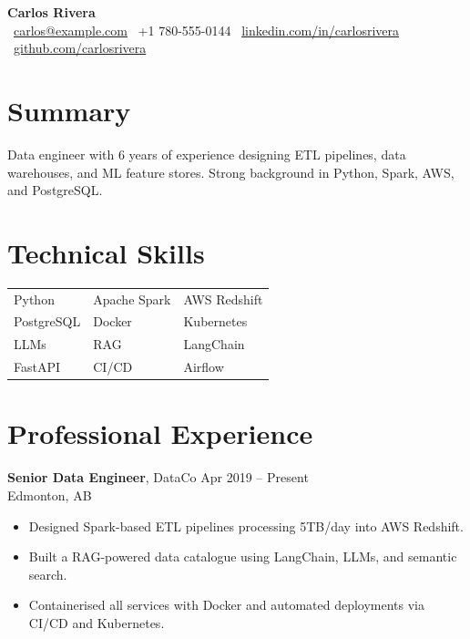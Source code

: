 \documentclass[10pt, letterpaper]{article}
\begin{document}
\begin{center}
    {\Large \textbf{Carlos Rivera}}\\[6pt]
    \faEnvelope\ \href{mailto:carlos@example.com}{carlos@example.com} \quad
    \faPhone\ +1 780-555-0144 \quad
    \faLinkedin\ \href{https://linkedin.com/in/carlosrivera}{linkedin.com/in/carlosrivera} \quad
    \faGithub\ \href{https://github.com/carlosrivera}{github.com/carlosrivera}
\end{center}

\section*{Summary}
Data engineer with 6 years of experience designing ETL pipelines, data warehouses, and
ML feature stores. Strong background in Python, Spark, AWS, and PostgreSQL.

\section*{Technical Skills}
\begin{tabularx}{\linewidth}{X X X}
    Python        & Apache Spark  & AWS Redshift  \\
    PostgreSQL    & Docker        & Kubernetes    \\
    LLMs          & RAG           & LangChain     \\
    FastAPI       & CI/CD         & Airflow       \\
\end{tabularx}

\section*{Professional Experience}
\textbf{Senior Data Engineer}, DataCo \hfill Apr 2019 -- Present\\
Edmonton, AB
\begin{itemize}[leftmargin=*]
    \item Designed Spark-based ETL pipelines processing 5TB/day into AWS Redshift.
    \item Built a RAG-powered data catalogue using LangChain, LLMs, and semantic search.
    \item Containerised all services with Docker and automated deployments via CI/CD and Kubernetes.
\end{itemize}
\end{document}
